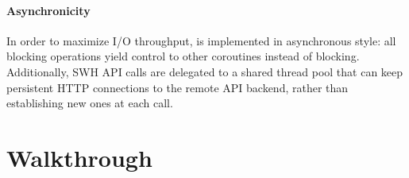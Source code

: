 %
% 
% 
% 


\paragraph*{Asynchronicity}

In order to maximize I/O throughput, \SWHFS{} is implemented in asynchronous
style:
all blocking operations yield control to other coroutines instead of blocking.
%
Additionally, SWH API calls are delegated to a shared thread pool that can keep
persistent HTTP connections to the remote API backend, rather than establishing
new ones at each call.


\section{Walkthrough}
\label{sec:fuse-walkthrough}

